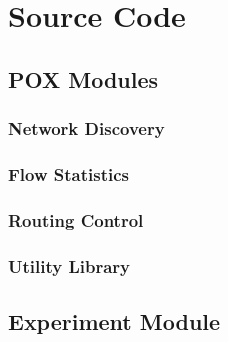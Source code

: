 \chapter{Source Code}

\section{POX Modules}

\subsection{Network Discovery}


\subsection{Flow Statistics}


\subsection{Routing Control}


\subsection{Utility Library}


\newpage
\section{Experiment Module}

